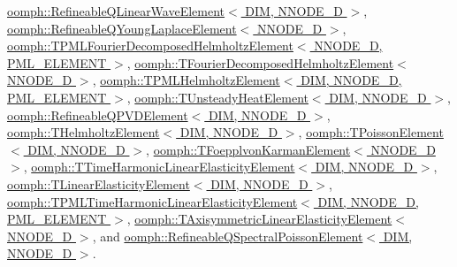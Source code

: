 \hyperlink{classoomph_1_1RefineableQLinearWaveElement_a79ebae3de0485161b4d47c904530ae85}{oomph\+::\+Refineable\+Q\+Linear\+Wave\+Element$<$ D\+I\+M, N\+N\+O\+D\+E\+\_\+D $>$}, \hyperlink{classoomph_1_1RefineableQYoungLaplaceElement_a529edc16e5232c8f1387f8858f8f20ad}{oomph\+::\+Refineable\+Q\+Young\+Laplace\+Element$<$ N\+N\+O\+D\+E\+\_\+D $>$}, \hyperlink{classoomph_1_1TPMLFourierDecomposedHelmholtzElement_a1fe9d66fb864483105f2d2cbabd072a0}{oomph\+::\+T\+P\+M\+L\+Fourier\+Decomposed\+Helmholtz\+Element$<$ N\+N\+O\+D\+E\+\_\+D, P\+M\+L\+\_\+\+E\+L\+E\+M\+E\+N\+T $>$}, \hyperlink{classoomph_1_1TFourierDecomposedHelmholtzElement_a283748c9f17bf71639fe86d407d9d041}{oomph\+::\+T\+Fourier\+Decomposed\+Helmholtz\+Element$<$ N\+N\+O\+D\+E\+\_\+D $>$}, \hyperlink{classoomph_1_1TPMLHelmholtzElement_ac3db20cd0947e95920c401d97836cf00}{oomph\+::\+T\+P\+M\+L\+Helmholtz\+Element$<$ D\+I\+M, N\+N\+O\+D\+E\+\_\+D, P\+M\+L\+\_\+\+E\+L\+E\+M\+E\+N\+T $>$}, \hyperlink{classoomph_1_1TUnsteadyHeatElement_a8fb6b9483f1e78e21144e1443a6f0f4d}{oomph\+::\+T\+Unsteady\+Heat\+Element$<$ D\+I\+M, N\+N\+O\+D\+E\+\_\+D $>$}, \hyperlink{classoomph_1_1RefineableQPVDElement_aa4b6b0cf475e1e26fc26ac8a17ddfac9}{oomph\+::\+Refineable\+Q\+P\+V\+D\+Element$<$ D\+I\+M, N\+N\+O\+D\+E\+\_\+D $>$}, \hyperlink{classoomph_1_1THelmholtzElement_af2725bbd8764cb649232a2577acd9df2}{oomph\+::\+T\+Helmholtz\+Element$<$ D\+I\+M, N\+N\+O\+D\+E\+\_\+D $>$}, \hyperlink{classoomph_1_1TPoissonElement_a86423f2dcb0bf2a440036ad0128a8bc6}{oomph\+::\+T\+Poisson\+Element$<$ D\+I\+M, N\+N\+O\+D\+E\+\_\+D $>$}, \hyperlink{classoomph_1_1TFoepplvonKarmanElement_aee9854af71ebdca47e675ee73dc589e4}{oomph\+::\+T\+Foepplvon\+Karman\+Element$<$ N\+N\+O\+D\+E\+\_\+D $>$}, \hyperlink{classoomph_1_1TTimeHarmonicLinearElasticityElement_ace9f72ad0f5b88d08f8364a8acc673b0}{oomph\+::\+T\+Time\+Harmonic\+Linear\+Elasticity\+Element$<$ D\+I\+M, N\+N\+O\+D\+E\+\_\+D $>$}, \hyperlink{classoomph_1_1TLinearElasticityElement_a41f8db113faa5d948d8a3ec21f8111b4}{oomph\+::\+T\+Linear\+Elasticity\+Element$<$ D\+I\+M, N\+N\+O\+D\+E\+\_\+D $>$}, \hyperlink{classoomph_1_1TPMLTimeHarmonicLinearElasticityElement_ac58c850dc51484b11de1b2ae07c3f1ea}{oomph\+::\+T\+P\+M\+L\+Time\+Harmonic\+Linear\+Elasticity\+Element$<$ D\+I\+M, N\+N\+O\+D\+E\+\_\+D, P\+M\+L\+\_\+\+E\+L\+E\+M\+E\+N\+T $>$}, \hyperlink{classoomph_1_1TAxisymmetricLinearElasticityElement_a622394d7222ff94019c022ae0cc5bf21}{oomph\+::\+T\+Axisymmetric\+Linear\+Elasticity\+Element$<$ N\+N\+O\+D\+E\+\_\+D $>$}, and \hyperlink{classoomph_1_1RefineableQSpectralPoissonElement_a10859fa076e489db05d21b30599edda9}{oomph\+::\+Refineable\+Q\+Spectral\+Poisson\+Element$<$ D\+I\+M, N\+N\+O\+D\+E\+\_\+D $>$}.



